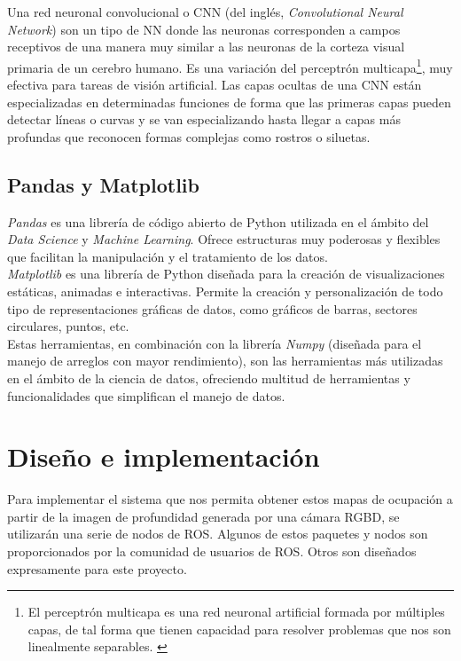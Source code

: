 Una red neuronal convolucional o CNN (del inglés, \textit{Convolutional Neural Network}) son un tipo de NN donde las neuronas corresponden a campos receptivos de una manera muy similar a las neuronas de la corteza visual primaria de un cerebro humano. Es una variación del perceptrón multicapa\footnote{El perceptrón multicapa es una red neuronal artificial formada por múltiples capas, de tal forma que tienen capacidad para resolver problemas que nos son linealmente separables. \cite{perceptron}}, muy efectiva para tareas de visión artificial. Las capas ocultas de una CNN están especializadas en determinadas funciones de forma que las primeras capas pueden detectar líneas o curvas y se van especializando hasta llegar a capas más profundas que reconocen formas complejas como rostros o siluetas. \cite{cnn} \\

\section{Pandas y Matplotlib}

\textit{Pandas} es una librería de código abierto de Python utilizada en el ámbito del \textit{Data Science} y \textit{Machine Learning}. Ofrece estructuras muy poderosas y flexibles que facilitan la manipulación y el tratamiento de los datos. \cite{pandas}\\

\textit{Matplotlib} es una librería de Python diseñada para la creación de visualizaciones estáticas, animadas e interactivas. Permite la creación y personalización de todo tipo de representaciones gráficas de datos, como gráficos de barras, sectores circulares, puntos, etc.\cite{matplotlib}\\

Estas herramientas, en combinación con la librería \textit{Numpy} (diseñada para el manejo de arreglos con mayor rendimiento), son las herramientas más utilizadas en el ámbito de la ciencia de datos, ofreciendo multitud de herramientas y funcionalidades que simplifican el manejo de datos.\\



\chapter{Diseño e implementación}

Para implementar el sistema que nos permita obtener estos mapas de ocupación a partir de la imagen de profundidad generada por una cámara RGBD, se utilizarán una serie de nodos de ROS. Algunos de estos paquetes y nodos son proporcionados por la comunidad de usuarios de ROS. Otros son diseñados expresamente para este proyecto.\\

